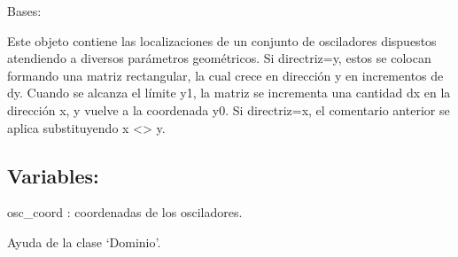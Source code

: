 \documentclass[letterpaper,10pt,english]{sphinxmanual}
\begin{document}
\begin{fulllineitems}
\label{\detokenize{myfpga:myfpga.ring_osc.Dominio}}
\pysigstartsignatures
{}
\pysigstopsignatures
\sphinxAtStartPar
Bases: 

\sphinxAtStartPar
Este objeto contiene las localizaciones de un conjunto de 
osciladores dispuestos atendiendo a diversos parámetros geométricos.
Si directriz=y, estos se colocan formando una matriz rectangular, la cual crece en
dirección y en incrementos de dy. Cuando se alcanza el límite y1, la matriz se incrementa
una cantidad dx en la dirección x, y vuelve a la coordenada y0. Si directriz=x, el 
comentario anterior se aplica substituyendo x \textless{}\sphinxhyphen{}\textgreater{} y.


\subsection{Variables:}
\label{\detokenize{myfpga:variables}}
\sphinxAtStartPar
osc\_coord : coordenadas de los osciladores.

\begin{fulllineitems}
\label{\detokenize{myfpga:myfpga.ring_osc.Dominio.help}}
\pysigstartsignatures
{}
\pysigstopsignatures
\sphinxAtStartPar
Ayuda de la clase ‘Dominio’.

\end{fulllineitems}


\end{fulllineitems}
\end{document}
